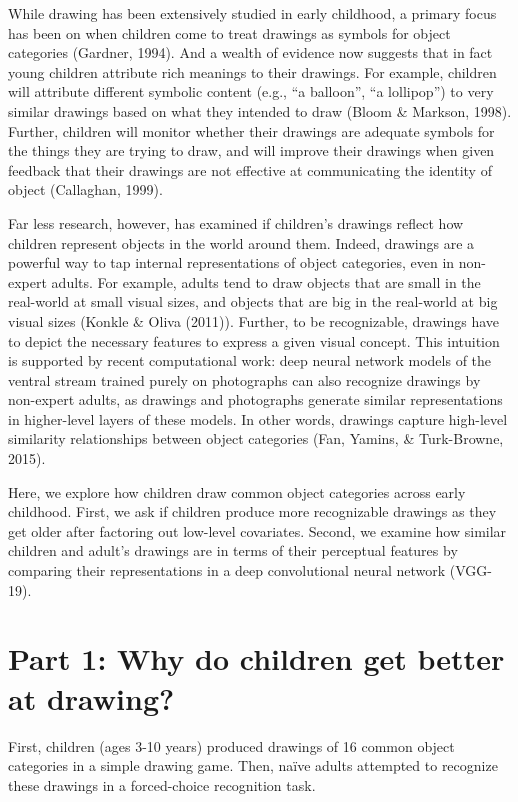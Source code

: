 \documentclass[10pt, letterpaper]{article}
\begin{document}
While drawing has been extensively studied in early childhood, a primary
focus has been on when children come to treat drawings as symbols for
object categories (Gardner, 1994). And a wealth of evidence now suggests
that in fact young children attribute rich meanings to their drawings.
For example, children will attribute different symbolic content (e.g.,
``a balloon'', ``a lollipop'') to very similar drawings based on what
they intended to draw (Bloom \& Markson, 1998). Further, children will
monitor whether their drawings are adequate symbols for the things they
are trying to draw, and will improve their drawings when given feedback
that their drawings are not effective at communicating the identity of
object (Callaghan, 1999).

Far less research, however, has examined if children's drawings reflect
how children represent objects in the world around them. Indeed,
drawings are a powerful way to tap internal representations of object
categories, even in non-expert adults. For example, adults tend to draw
objects that are small in the real-world at small visual sizes, and
objects that are big in the real-world at big visual sizes (Konkle \&
Oliva (2011)). Further, to be recognizable, drawings have to depict the
necessary features to express a given visual concept. This intuition is
supported by recent computational work: deep neural network models of
the ventral stream trained purely on photographs can also recognize
drawings by non-expert adults, as drawings and photographs generate
similar representations in higher-level layers of these models. In other
words, drawings capture high-level similarity relationships between
object categories (Fan, Yamins, \& Turk-Browne, 2015).

Here, we explore how children draw common object categories across early
childhood. First, we ask if children produce more recognizable drawings
as they get older after factoring out low-level covariates. Second, we
examine how similar children and adult's drawings are in terms of their
perceptual features by comparing their representations in a deep
convolutional neural network (VGG-19).

\section{Part 1: Why do children get better at
drawing?}\label{part-1-why-do-children-get-better-at-drawing}

First, children (ages 3-10 years) produced drawings of 16 common object
categories in a simple drawing game. Then, naïve adults attempted to
recognize these drawings in a forced-choice recognition task.
\end{document}
